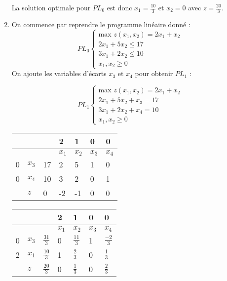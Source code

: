\documentclass{article}
\begin{document}
\begin{enumerate}

La solution optimale pour $PL_{0}$ est donc $x_{1}=\frac{10}{3}$ et $x_{2}={0}$ avec $z=\frac{20}{3}$.

\item On commence par reprendre le programme linéaire donné :
\begin{displaymath}
PL_{0}\begin{cases} 
\text{max } z(x_{1},x_{2})=2x_{1}+x_{2} \\
2x_{1}+5x_{2} \leq 17 \\
3x_{1}+2x_{2} \leq 10 \\
x_{1}, x_{2} \geq 0
\end{cases}
\end{displaymath}
On ajoute les variables d'écarts $x_{3}$ et $x_{4}$ pour obtenir $PL_{1}$ :

\begin{displaymath}
PL_{1}\begin{cases} 
\text{max } z(x_{1},x_{2})=2x_{1}+x_{2} \\
2x_{1}+5x_{2} + x_{3} = 17 \\
3x_{1}+2x_{2} + x_{4} = 10 \\
x_{1}, x_{2} \geq 0
\end{cases}
\end{displaymath}


\begin{tabular}{|p{0.75cm}|p{0.75cm}|p{0.75cm}|p{0.75cm}|p{0.75cm}|p{0.75cm}|p{0.75cm}|}
   \hline
  \multicolumn{3}{|c|}{} & 2 & 1 & 0 & 0\\
     \hline
   & && $x_{1}$&$x_{2}$ &$x_{3}$ &$x_{4}$\\
   \hline
   0&$x_{3}$ &17& 2&5 &1 &0\\
   \hline
   0&$x_{4}$ & 10 &3 & 2&0 &1\\
   \hline
      & $z$& 0&-2 &-1 &0 &0\\
      \hline
\end{tabular}

\begin{tabular}{|p{0.75cm}|p{0.75cm}|p{0.75cm}|p{0.75cm}|p{0.75cm}|p{0.75cm}|p{0.75cm}|}
   \hline
  \multicolumn{3}{|c|}{} & 2 & 1 & 0 & 0\\
   \hline
   & && $x_{1}$&$x_{2}$ &$x_{3}$ &$x_{4}$\\
   \hline
   0&$x_{3}$ &$\frac{31}{3}$& 0&$\frac{11}{3} $&1 &$\frac{-2}{3}$\\
   \hline
   2&$x_{1}$ & $\frac{10}{3}$ &1 & $\frac{2}{3}$&0 & $\frac{1}{3}$\\
   \hline
      & $z$& $\frac{20}{3}$&0 &$\frac{1}{3}$ &0 &$\frac{2}{3}$\\
      \hline
\end{tabular}


\end{enumerate}
\end{document}
